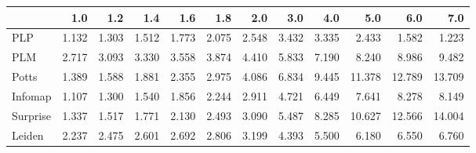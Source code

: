 \begin{tabular}{lrrrrrrrrrrr}
\toprule
{} &   1.0 &   1.2 &   1.4 &   1.6 &   1.8 &   2.0 &   3.0 &   4.0 &    5.0 &    6.0 &    7.0 \\
\midrule
PLP      & 1.132 & 1.303 & 1.512 & 1.773 & 2.075 & 2.548 & 3.432 & 3.335 &  2.433 &  1.582 &  1.223 \\
PLM      & 2.717 & 3.093 & 3.330 & 3.558 & 3.874 & 4.410 & 5.833 & 7.190 &  8.240 &  8.986 &  9.482 \\
Potts    & 1.389 & 1.588 & 1.881 & 2.355 & 2.975 & 4.086 & 6.834 & 9.445 & 11.378 & 12.789 & 13.709 \\
Infomap  & 1.107 & 1.300 & 1.540 & 1.856 & 2.244 & 2.911 & 4.721 & 6.449 &  7.641 &  8.278 &  8.149 \\
Surprise & 1.337 & 1.517 & 1.771 & 2.130 & 2.493 & 3.090 & 5.487 & 8.285 & 10.627 & 12.566 & 14.004 \\
Leiden   & 2.237 & 2.475 & 2.601 & 2.692 & 2.806 & 3.199 & 4.393 & 5.500 &  6.180 &  6.550 &  6.760 \\
\bottomrule
\end{tabular}
